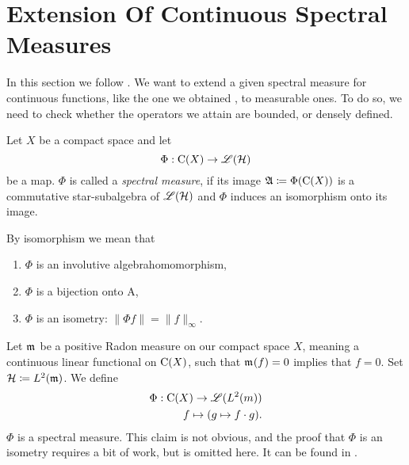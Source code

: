
\section{Extension Of Continuous Spectral Measures}

In this section we follow \cite{LesHaupt}.
We want to extend a given spectral measure for continuous functions, like the one we obtained
, to 
measurable ones. To do so, we need to check whether the operators we attain
are bounded, or densely defined.
\begin{defi}
 
 Let $X$ be a compact space and let
 \[
  \Phi : \operatorname{C} (X) \to \mathscr{L}(\mathcal{H})
 \]
be a map. $\Phi$ is called a \textit{spectral measure}, if its image 
$\mathfrak{A} \coloneqq \Phi(\operatorname{C} (X))$ is a commutative star-subalgebra of $\mathscr{L}(\mathcal{H})$ and 
$\Phi$ induces an isomorphism onto its image.
\end{defi}

\begin{rem}
 By isomorphism we mean that
 \begin{enumerate}
  \item $\Phi$ is an involutive algebrahomomorphism,
  \item $\Phi$ is a bijection onto A,
  \item $\Phi$ is an isometry: $\| \Phi f \| = \| f \|_\infty$.
 \end{enumerate}

\end{rem}

\begin{expl}
Let $\mathfrak{m}_{}$ be a positive Radon measure on our compact space $X$, meaning a
continuous linear functional on $\operatorname{C} (X)$, such that $\mathfrak{m}_{}(f) = 0$ implies 
that $f=0$. Set $\mathcal{H} \coloneqq L^2(\mathfrak{m})$.
We define 
\begin{align*}
 \Phi : \operatorname{C}(X) \to \mathscr{L}({L^2({m})}) \\
 f \mapsto (g \mapsto f\cdot g).
\end{align*}
$\Phi$ is a spectral measure. This claim is not obvious, and the proof
that $\Phi$ is an isometry requires a bit of work, but is omitted here.
It can be found in \cite{LesHaupt}. 
\end{expl}

